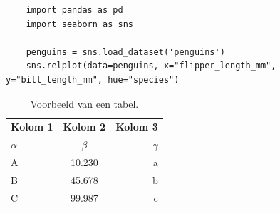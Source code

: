 \begin{listing}
  \begin{verbatim}
    import pandas as pd
    import seaborn as sns

    penguins = sns.load_dataset('penguins')
    sns.relplot(data=penguins, x="flipper_length_mm", y="bill_length_mm", hue="species")
  \end{verbatim}
  \caption[Voorbeeld codefragment]{Voorbeeld van het invoegen van een codefragment.}
\end{listing}

\lipsum[7-20]

\begin{table}
  \centering
  \begin{tabular}{lcr}
    \toprule
    \textbf{Kolom 1} & \textbf{Kolom 2} & \textbf{Kolom 3} \\
    $\alpha$         & $\beta$          & $\gamma$         \\
    \midrule
    A                & 10.230           & a                \\
    B                & 45.678           & b                \\
    C                & 99.987           & c                \\
    \bottomrule
  \end{tabular}
  \caption[Voorbeeld tabel]{\label{tab:example}Voorbeeld van een tabel.}
\end{table}


\chapter{}%
\label{ch:methodologie}


